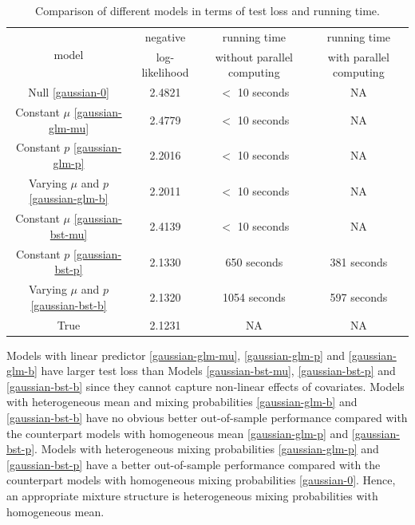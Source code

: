 \documentclass[11pt]{article}
\numberwithin{equation}{section}
\begin{document}
\begin{table}[htp!]
	\caption{Comparison of different models in terms of test loss and running time.}\label{gaussian-summary}
			\centering
	\begin{tabular}{c|ccc}
		\hline
		\multirow{2}{*}{model} & negative       & running time               & running time            \\
		& log-likelihood & without parallel computing & with parallel computing \\ \hline
		Null \eqref{gaussian-0}                   & 2.4821         & $<$ 10 seconds       & NA    \\
		Constant $\mu$	\eqref{gaussian-glm-mu}                & 2.4779         & $<$ 10 seconds       & NA    \\
		Constant $p$ \eqref{gaussian-glm-p}                 & 2.2016         & $<$ 10 seconds       & NA   \\
		Varying $\mu$ and $p$ \eqref{gaussian-glm-b}              & 2.2011         & $<$ 10 seconds       & NA   \\
		Constant $\mu$ \eqref{gaussian-bst-mu}                & 2.4139         & $<$ 10 seconds       & NA    \\
		Constant $p$ \eqref{gaussian-bst-p}                 & 2.1330          &            650 seconds                & 381 seconds           \\
		Varying $\mu$ and $p$ \eqref{gaussian-bst-b}              & 2.1320          &              1054 seconds              & 597 seconds               \\
		True                   & 2.1231         &            NA                &               NA         \\ \hline
	\end{tabular}
\end{table}
Models with linear predictor  \eqref{gaussian-glm-mu}, \eqref{gaussian-glm-p} and \eqref{gaussian-glm-b} have larger test loss 
than Models \eqref{gaussian-bst-mu}, \eqref{gaussian-bst-p} and \eqref{gaussian-bst-b} 
since they cannot capture non-linear effects of covariates.
Models with heterogeneous mean and mixing probabilities \eqref{gaussian-glm-b} and \eqref{gaussian-bst-b}  have no obvious better out-of-sample performance compared with the counterpart models with homogeneous mean \eqref{gaussian-glm-p} and \eqref{gaussian-bst-p}.
Models with heterogeneous mixing probabilities \eqref{gaussian-glm-p} and \eqref{gaussian-bst-p} have a better out-of-sample performance compared with the counterpart models with homogeneous mixing probabilities \eqref{gaussian-0}.
Hence, an appropriate mixture structure is heterogeneous mixing probabilities with homogeneous mean. 
\end{document}
